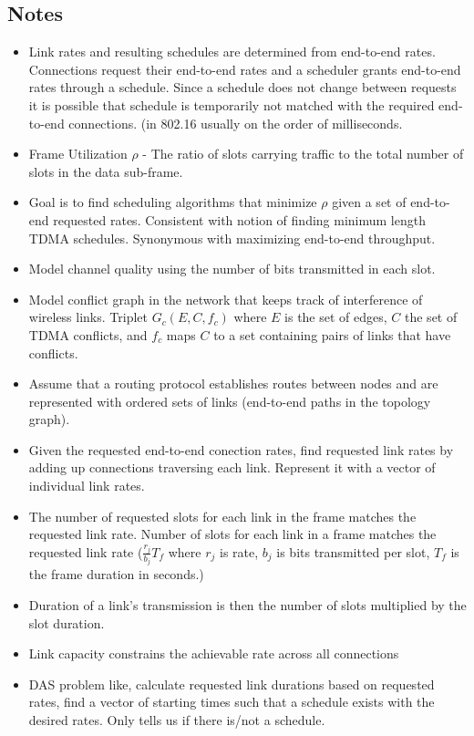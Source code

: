 \documentclass{article}
\begin{document}
\subsection{Notes}
\begin{itemize}
    \item Link rates and resulting schedules are determined from end-to-end rates.  Connections request their end-to-end rates and a scheduler grants end-to-end rates through a schedule.  Since a schedule does not change between requests it is possible that schedule is temporarily not matched with the required end-to-end connections. (in 802.16 usually on the order of milliseconds.
    \item Frame Utilization $\rho$ - The ratio of slots carrying traffic to the total number of slots in the data sub-frame.
    \item Goal is to find scheduling algorithms that minimize $\rho$  given a set of end-to-end requested rates.  Consistent with notion of finding minimum length TDMA schedules.  Synonymous with maximizing end-to-end throughput.
    \item Model channel quality using the number of bits transmitted in each slot.
    \item Model conflict graph in the network that keeps track of interference of wireless links.  Triplet $G_c (E,C,f_c)$ where $E$ is the set of edges, $C$ the set of TDMA conflicts, and $f_c$ maps $C$ to a set containing pairs of links that have conflicts.
    \item Assume that a routing protocol establishes routes between nodes and are represented with ordered sets of links (end-to-end paths in the topology graph).
    \item Given the requested end-to-end conection rates, find requested link rates by adding up connections traversing each link.  Represent it with a vector of individual link rates.
    \item The number of requested slots for each link in the frame matches the requested link rate.  Number of slots for each link in a frame matches the requested link rate ($\frac{r_j}{b_j}T_f$ where $r_j$ is rate, $b_j$ is bits transmitted per slot, $T_f$ is the frame duration in seconds.)
    \item Duration of a link's transmission is then the number of slots multiplied by the slot duration.
    \item Link capacity constrains the achievable rate across all connections
    \item DAS problem like, calculate requested link durations based on requested rates, find a vector of starting times such that a schedule exists with the desired rates.  Only tells us if there is/not a schedule.

\end{itemize}
\end{document}

